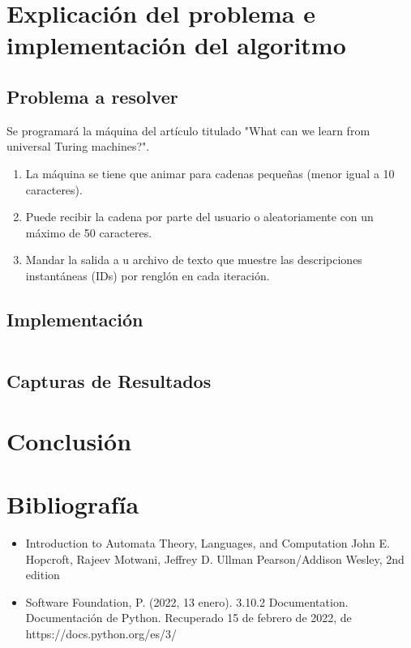 \documentclass{article}
\begin{document}
\section{Explicaci\'on del problema e implementaci\'on del algoritmo}
\subsection{Problema a resolver}
Se programará la máquina del artículo titulado "What can we learn from universal Turing machines?".
\begin{enumerate}
    \item La máquina se tiene que animar para cadenas pequeñas (menor igual a 10 caracteres).
    \item Puede recibir la cadena por parte del usuario o aleatoriamente con un máximo de 50 caracteres.
    \item Mandar la salida a u archivo de texto que muestre las descripciones instantáneas (IDs) por renglón en cada iteración.
\end{enumerate}
\subsection{Implementaci\'on}
\begin{lstlisting}
\end{lstlisting}
\subsection{Capturas de Resultados}
\section{Conclusi\'on}
\section{Bibliograf\'ia}
\begin{itemize}
    \item Introduction to Automata Theory, Languages, and Computation
    John E. Hopcroft, Rajeev Motwani, Jeffrey D. Ullman
    Pearson/Addison Wesley, 2nd edition
    \item Software Foundation, P. (2022, 13 enero). 3.10.2 Documentation. Documentación de Python. Recuperado 15 de febrero de 2022, de https://docs.python.org/es/3/
\end{itemize}
\end{document}
